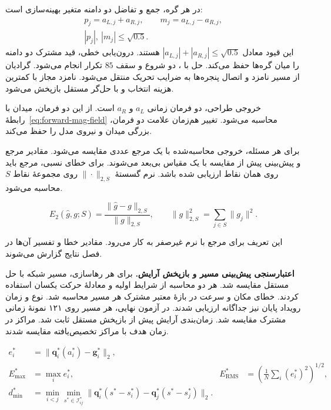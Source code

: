 در هر گره، جمع و تفاضل دو دامنه متغیر بهینه‌سازی است:
\begin{equation}
\begin{gathered}
p_j=a_{L,j}+a_{R,j},\qquad m_j=a_{L,j}-a_{R,j},\\
|p_j|,\ |m_j|\le\sqrt{0.5}.
\end{gathered}
\end{equation}
این قیود معادل $|a_{L,j}|+|a_{R,j}|\le\sqrt{0.5}$ هستند.
درون‌یابی خطی، قید مشترک دو دامنه را میان گره‌ها حفظ می‌کند.
حل با ، دو شروع و سقف $85$ تکرار انجام می‌شود.
گرادیان از مسیر نامزد و اتصال پنجره‌ها به ضرایب تحریک منتقل می‌شود.
نامزد مجاز با کمترین هزینه انتخاب و با حل‌گر مستقل بازپخش می‌شود.

خروجی طراحی، دو فرمان زمانی $a_L$ و $a_R$ است.
از این دو فرمان، میدان با رابطهٔ~\eqref{eq:forward-mag-field} محاسبه می‌شود.
تغییر هم‌زمان علامت دو فرمان، بزرگی میدان و نیروی مدل را حفظ می‌کند.

\label{sec:theory-validation-metrics}

برای هر مسئله، خروجی محاسبه‌شده با یک مرجع عددی مقایسه می‌شود.
مقادیر مرجع و پیش‌بینی پیش از مقایسه با یک مقیاس بی‌بعد می‌شوند.
برای خطای نسبی، مرجع باید روی همان نقاط ارزیابی شده باشد.
نرم گسستهٔ $\|\cdot\|_{2,S}$ روی مجموعهٔ نقاط $S$ محاسبه می‌شود.

\begin{equation}
E_2(\widehat g,g;S)=
\frac{\|\widehat g-g\|_{2,S}}{\|g\|_{2,S}},
\qquad
\|g\|_{2,S}^2=\sum_{j\in S}\|g_j\|^2.
\label{eq:validation-relative-l2}
\end{equation}

این تعریف برای مرجع با نرم غیرصفر به کار می‌رود.
مقادیر خطا و تفسیر آن‌ها در فصل نتایج گزارش می‌شوند.

\textbf{اعتبارسنجی پیش‌بینی مسیر و بازپخش آرایش.}
برای هر رهاسازی، مسیر شبکه با حل مستقل  مقایسه شد.
هر دو محاسبه از شرایط اولیه و معادلهٔ حرکت یکسان استفاده کردند.
خطای مکان و سرعت در بازهٔ معتبر مشترک هر مسیر محاسبه شد.
نوع و زمان رویداد پایان نیز جداگانه ارزیابی شدند.
در آزمون نهایی، هر مسیر روی ۱۲۱ نمونهٔ زمانی مشترک مقایسه شد.
زمان‌بندی آرایش پیش از بازپخش مستقل ثابت شد.
مراکز در زمان هدف با مراکز تخصیص‌یافته مقایسه شدند.

\begin{equation}
\begin{aligned}
e_i^*&=\|\mathbf q_i^*(a_i^*)-\mathbf g_i^*\|_2,\\
E_{\max}^*&=\max_i e_i^*,&
E_{\mathrm{RMS}}^*&=\left(\frac{1}{N}\sum_i(e_i^*)^2\right)^{1/2},\\
d_{\min}^*&=\min_{i<j}\min_{s^*\in\mathcal I_{ij}^*}
 \|\mathbf q_i^*(s^*-s_i^*)-\mathbf q_j^*(s^*-s_j^*)\|_2 .
\end{aligned}
\label{eq:validation-formation-errors}
\end{equation}

